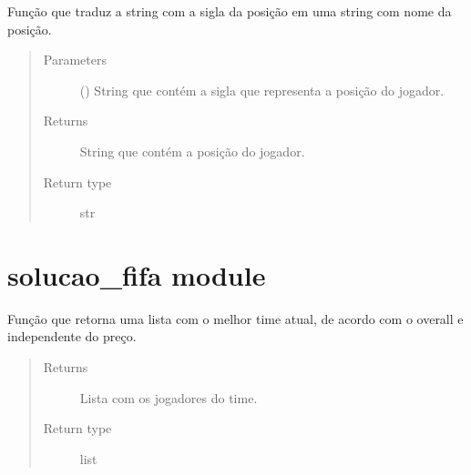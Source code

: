 \documentclass[letterpaper,10pt,brazil]{sphinxmanual}
\begin{document}

\begin{fulllineitems}
\label{\detokenize{funcoes_auxiliares:funcoes_auxiliares.traduz_posicao}}
Função que traduz a string com a sigla da posição em uma string com nome da posição.
\begin{quote}\begin{description}
\item[{Parameters}] \leavevmode
{} () \textendash{} String que contém a sigla que representa a posição do jogador.

\item[{Returns}] \leavevmode
String que contém a posição do jogador.

\item[{Return type}] \leavevmode
str

\end{description}\end{quote}

\end{fulllineitems}



\section{solucao\_fifa module}
\label{\detokenize{solucao_fifa:module-solucao_fifa}}\label{\detokenize{solucao_fifa:solucao-fifa-module}}\label{\detokenize{solucao_fifa::doc}}

\begin{fulllineitems}
\label{\detokenize{solucao_fifa:solucao_fifa.melhor_time_atual}}
Função que retorna uma lista com o melhor time atual, de acordo com o overall e         independente do preço.
\begin{quote}\begin{description}
\item[{Returns}] \leavevmode
Lista com os jogadores do time.

\item[{Return type}] \leavevmode
list

\end{description}\end{quote}

\end{fulllineitems}
\end{document}
